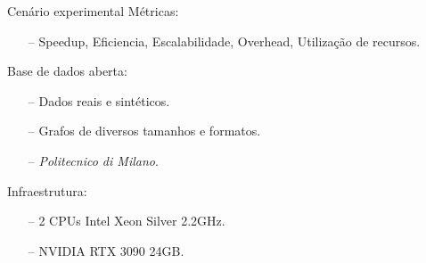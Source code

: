\begin{frame}{Cenário experimental}
    Métricas:
    \begin{itemize}
        \item[--] Speedup, Eficiencia, Escalabilidade, Overhead, Utilização de recursos.
    \end{itemize}

    Base de dados aberta:
    \begin{itemize}
        \item[--] Dados reais e sintéticos.
        \item[--] Grafos de diversos tamanhos e formatos.
        \item[--] \textit{Politecnico di Milano}.
    \end{itemize}

    Infraestrutura:
    \begin{itemize}
        \item[--] 2 CPUs Intel Xeon Silver 2.2GHz.
        \item[--] NVIDIA RTX 3090 24GB.
    \end{itemize}
\end{frame}
